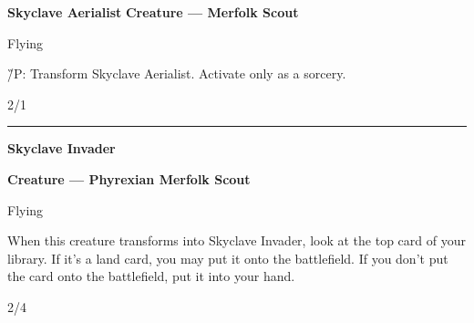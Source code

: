 \documentclass[8pt]{extarticle}
\begin{document}
{\large\textbf{Skyclave Aerialist}}
\hfill
\1\U

\textbf{Creature — Merfolk Scout}

Flying

\4\G/P: Transform Skyclave Aerialist. Activate only as a sorcery.

\hfill2/1

\vfill
\hrule
\vfill

{\large\textbf{Skyclave Invader}}

\textbf{Creature — Phyrexian Merfolk Scout}

Flying

When this creature transforms into Skyclave Invader, look at the top card of your library. If it's a land card, you may put it onto the battlefield. If you don't put the card onto the battlefield, put it into your hand.

\hfill2/4
\end{document}
